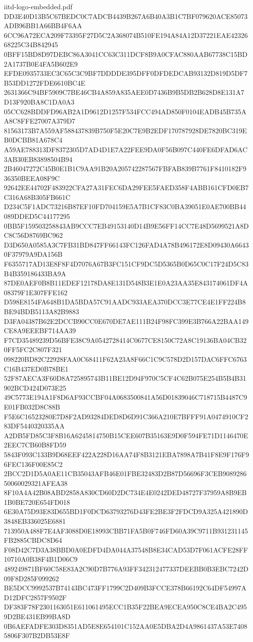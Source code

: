 \begin{filecontents*}[overwrite]{iitd-logo-embedded.pdf}
DD3E40D13B5C67BEDC0C7ADCB4439B267A6B40A3B1C7BF079620ACE85073ADB96BB1A66BB4F6AA
6CC96A72ECA209F73395F27D5C2A368074B510FE194A84A12D37221EAE4232668225C34B842945
0BFF15BD8D97DEBC86A3041CC63C311DCF8B9A0CFAC880AAB67738C15BD2A1737B0E4FA5B602E9
EFDE0935733EC3C65C3C9BF7DDDDE395DFF0DFDEDCAB93132D819D5DF7B53DD1272FDE6610BC4E
2631366C94BF5909C7BE46CB4A859A835AEE0D7436B9B5DB2B628D8E131A7D13F920BA8C1DA0A3
05CC628BDDFD96AB2A1D9612D1257F534FCC494AD850F0104EADB45B735AA8C8FFE27007A379D7
81563173B7A559AF588437839B750F5E20C7E9B2EDF170787928DE7820BC319EB0DCBB81A678C4
A59AE788313DF8372305D7AD4D1E7A22FEE9DA0F56B097C440FE6DFAD6AC3AB30EB83898504B94
2B46047272C45B0E1B1C9AA91B20A205742287567FBFAB839B7761F8410182F936350BEEA08F9C
92642EE44702F483922CFA27A31FEC6DA29FEE5FAED358F4ABB161CFD0EB7C316A68B305FB661C
D234C5F1ADC73216B87EF10FD704159E5A7B1CF83C0BA39051E0AE700BB44089DDED5C44177295
0BB5F159503258843AB9CCC7EB49153140D14B9E56FF14CC7E48D5699521A8DC8C56D8769BC962
D3D650A0585A3C7FB31BD847FF66143FC126FAD4A78B496172E8D09430A66430F37979A9DA156B
F6355717AD13E8F8F4D7076A67B3FC151CF9DC5D5365B0D65C0C17F24D5C83B4B359186433BA9A
87DE0AEF0B8B11EDEF12178DA8E131D548B3E1E0A23AA35E843174061DF4A08379F1E307FFE162
D598E8154FA648B1DA5BDA57C91AADC933AEA370DCC3E77CE4E1FF224B8BE94BDB5113A82B9883
D3FA04387B62E2DCCB90CC0E670DE7AE111B24F98FC399E3B766A22BAA149CE8A9EEEBF714AA39
F7CD35489239D56BFE38C9A0542728414C0677CE8150C72A8C19136BA04CB320FF5FC2C807F321
098220BD82C22928FAA0C68411F62A23A8F66C1C9C578D2D157DAC6FFC6763C16B437ED0B78BE1
52F87AECA3F60D8A725895743B11BE12D94F970C5CF4C62B075E254B5B4B31902BCD424D073E25
49C5773E194A1F8D6AF93CCBF04A0683500841A56D01839046C718715B4487C9E01FB032D8C88B
F5E6C16523280E7D8F2AD93284DED8D6D91C366A210E7BFFF91A0474910CF283DF5440320335AA
A2DB5FD85C3F8B16A6245814750B15CEE607B35163E9D0F594FE71D1146470E2EEC7CB60B8FD59
5843F093C133B9D68EEF422A228D16AA74F8B3121EBA7898A7B41F8E9F176F96FEC136F00E85C2
2BCC2D1D5A0AE11CB35043AFB46E01FBE32483D2B87D56696F3CEB908928650060029321AFEA38
8F10A4A42B08ABD2858A830CD60D2DC734E4E0242DED48727F37959A8B9EB1B0BE720E654FD018
6E30A75D93E83D655BD1F0DCD63793276D43FE2BE3F2FDCD9A325A421890D3848EB336025E6881
713950A488F7E4AF3088D0E18993CBB71FA5B0F746FD60A39C9711B931231145FB2885CBDC8D64
F08D42C7D3A38BBD0A0EDFD4DA044A37548B8E34CAD53D7F061ACFE28FF10710A0B38F4B1D06C9
489249871BF60C58E83A2C90D7B776A93FF342312477337DEEBB0B3EBC7242D09F8D285F099262
BE5DCC9992537B74143BC473FF1799C2D409B3FCCE378B66192C64DF54997AD12DFC2857F9502F
DF383F78F2301163051E611061495ECC1B35F22BEA9ECEA950C8CE4BA2C4959D2BE431EB99BA8D
0B6AEFADFE303D8351AD5E8E654101C152AA0E5DBA2D4A9861437A53E74085806F307B2DB53E8F

\end{filecontents*}
